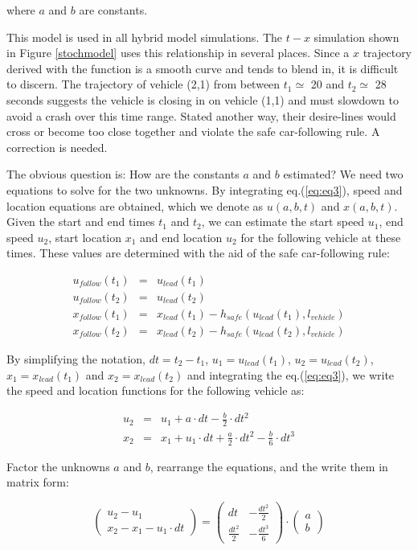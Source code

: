 \documentclass[Proceedings]{ascelike}
\begin{document}
\noindent where $a$ and $b$ are constants. 

This model is used in all hybrid model simulations. The $t-x$ simulation shown in Figure \ref{stochmodel} uses this relationship in several places. Since a $x$ trajectory derived with the function is a smooth curve and tends to blend in, it is difficult to discern.  The trajectory of vehicle (2,1) from between $t_1 \simeq$ 20 and $t_2 \simeq$ 28 seconds suggests the vehicle is closing in on vehicle (1,1) and must slowdown to avoid a crash over this time range. Stated another way, their desire-lines would cross or become too close together and violate the safe car-following rule. A correction is needed.

The obvious question is: How  are the constants $a$ and $b$ estimated? We need two equations to solve for the two unknowns. By integrating eq.(\ref{eq:eq3}), speed and location equations are obtained, which we denote as $u(a,b,t)$ and $x(a,b,t)$. Given the start and end times $t_1$ and $t_2$, we can estimate the start speed $u_1$, end speed $u_2$, start location $x_1$ and end location $u_2$ for the following vehicle at these times. These values are determined with the aid of the safe car-following rule:

\begin{eqnarray} 
u_{follow}(t_1) &=& u_{lead}(t_1) \\
u_{follow}(t_2) &=& u_{lead}(t_2) \\
x_{follow}(t_1) &=& x_{lead}(t_1) - h_{safe}(u_{lead}(t_1), l_{vehicle}) \\
x_{follow}(t_2) &=& x_{lead}(t_2) - h_{safe}(u_{lead}(t_2), l_{vehicle})  
\end{eqnarray}

\noindent By simplifying  the notation, $dt = t_2 - t_1$, $u_1 = u_{lead}(t_1)$,  $u_2 = u_{lead}(t_2)$, $x_1 = x_{lead}(t_1)$ and $x_2 = x_{lead}(t_2)$ and integrating the eq.(\ref{eq:eq3}), we write the speed and location functions for the following vehicle as:

\begin{eqnarray} 
u_2 &=& u_1 + a \cdot dt - \frac{b}{2} \cdot dt^2 \\
x_2 &=& x_1 + u_1 \cdot dt + \frac{a}{2}  \cdot dt^2 - \frac{b}{6} \cdot dt^3  
\end{eqnarray}

\noindent Factor the unknowns $a$ and $b$, rearrange the equations, and the  write them in matrix form:

\begin{equation}
  \begin{pmatrix}
 u_2 - u_1 \\
 x_2 - x_1 - u_1 \cdot dt
\end{pmatrix} =
\begin{pmatrix}
    dt & - \frac{dt^2}{2}\\
    \frac{dt^2}{2} & - \frac{dt^3}{6}
  \end{pmatrix} \cdot
  \begin{pmatrix}
    a \\
    b
    \end{pmatrix}
\end{equation}
\end{document}
